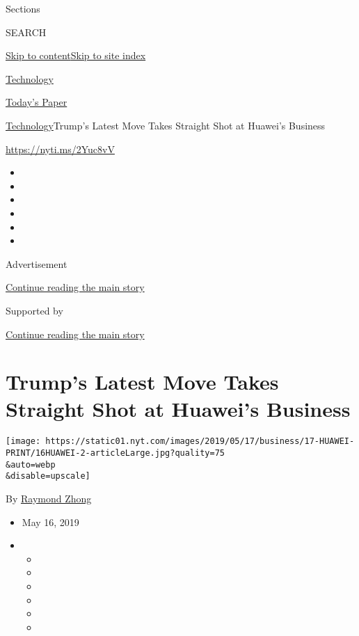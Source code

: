 Sections

SEARCH

\protect\hyperlink{site-content}{Skip to
content}\protect\hyperlink{site-index}{Skip to site index}

\href{https://www.nytimes.com/section/technology}{Technology}

\href{https://myaccount.nytimes.com/auth/login?response_type=cookie\&client_id=vi}{}

\href{https://www.nytimes.com/section/todayspaper}{Today's Paper}

\href{/section/technology}{Technology}\textbar{}Trump's Latest Move
Takes Straight Shot at Huawei's Business

\url{https://nyti.ms/2Yuc8vV}

\begin{itemize}
\item
\item
\item
\item
\item
\item
\end{itemize}

Advertisement

\protect\hyperlink{after-top}{Continue reading the main story}

Supported by

\protect\hyperlink{after-sponsor}{Continue reading the main story}

\hypertarget{trumps-latest-move-takes-straight-shot-at-huaweis-business}{%
\section{Trump's Latest Move Takes Straight Shot at Huawei's
Business}\label{trumps-latest-move-takes-straight-shot-at-huaweis-business}}

\texttt{[image: https://static01.nyt.com/images/2019/05/17/business/17-HUAWEI-PRINT/16HUAWEI-2-articleLarge.jpg?quality=75\\\&auto=webp\\\&disable=upscale]}

By \href{https://www.nytimes.com/by/raymond-zhong}{Raymond Zhong}

\begin{itemize}
\item
  May 16, 2019
\item
  \begin{itemize}
  \item
  \item
  \item
  \item
  \item
  \item
  \end{itemize}
\end{itemize}


